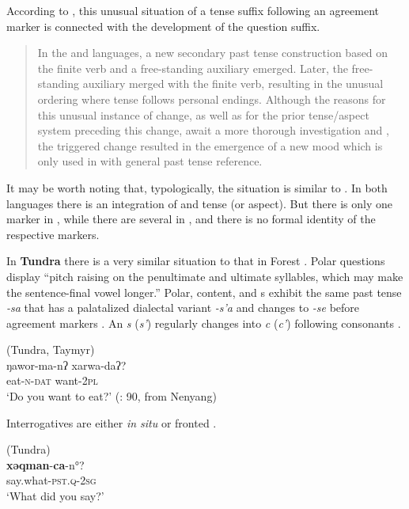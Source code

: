 \noindent According to \citet[403]{Siegl2012}, this unusual situation of a tense suffix following an agreement marker is connected with the development of the question suffix.

\begin{quote}
In the  and  languages, a new secondary past tense construction based on the finite verb and a free-standing auxiliary emerged. Later, the free-standing auxiliary merged with the finite verb, resulting in the unusual ordering where tense follows personal endings. Although the reasons for this unusual instance of change, as well as for the prior tense/aspect system preceding this change, await a more thorough investigation and , the triggered change resulted in the emergence of a new mood which is only used in  with general past tense reference.
\end{quote}

\noindent It may be worth noting that, typologically, the situation is similar to . In both languages there is an integration of  and tense (or aspect). But there is only one marker in , while there are several in , and there is no formal identity of the respective markers.

In \textbf{Tundra } there is a very similar situation to that in Forest . Polar questions display “pitch raising on the penultimate and ultimate syllables, which may make the sentence-final vowel longer.” \citep[267]{Nikolaeva2014} Polar, content, and s exhibit the same past tense  \textit{-sa} that has a palatalized dialectal variant \textit{-s’a} and changes to \textit{-se} before agreement markers \citep[97]{Nikolaeva2014}. An \textit{s} (\textit{s’}) regularly changes into \textit{c} (\textit{c’}) following consonants \citep[20]{Nikolaeva2014}.

\ea%
    \label{ex:ural:6}
     (Tundra, Taymyr)\\
    \gll ŋawor-ma-nʔ    xarwa-daʔ?\\
    eat-\textsc{n}-\textsc{dat}    want-2\textsc{pl}\\
    \glt ‘Do you want to eat?’ (\citealt{Mus2015b}: 90, from Nenyang)
    \z

Interrogatives are either \textit{in situ} or fronted \citep[266]{Nikolaeva2014}.

\ea%
    \label{ex:ural:7}
     (Tundra)\\
    \ea
    \gll \textbf{{xəqman}}{-}\textbf{{ca}}{-n°?}\\
    say.what-\textsc{pst}.\textsc{q}-2\textsc{sg}\\
    \glt ‘What did you say?’
    
